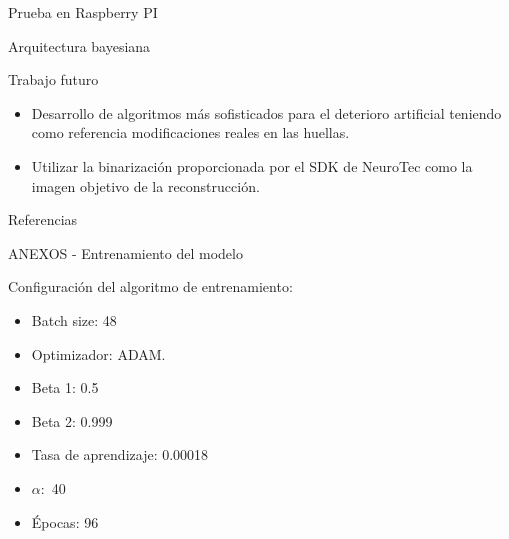 \documentclass[12pt,aspectratio=169]{beamer}
\begin{document}
\begin{frame}{Prueba en Raspberry PI}

\end{frame}

\begin{frame}{Arquitectura bayesiana}

\end{frame}

\begin{frame}{Trabajo futuro}

    \begin{itemize}
        \setlength\itemsep{5mm}
        \item Desarrollo de algoritmos más sofisticados para el deterioro artificial teniendo como referencia modificaciones reales en las huellas.
        \item Utilizar la binarización proporcionada por el SDK de NeuroTec como la imagen objetivo de la reconstrucción.
    \end{itemize}

\end{frame}

\nocite{*}
\begin{frame}[allowframebreaks]{Referencias}


\end{frame}

\begin{frame}{ANEXOS - Entrenamiento del modelo}

     Configuración del algoritmo de entrenamiento:
     \vspace{5mm}
     
     \begin{itemize}
        \item Batch size: 48
        \item Optimizador: ADAM.
        \item Beta 1: 0.5
        \item Beta 2: 0.999
        \item Tasa de aprendizaje: 0.00018
        \item $\alpha:$ 40
        \item Épocas: 96
    \end{itemize}
    
\end{frame}
\end{document}
